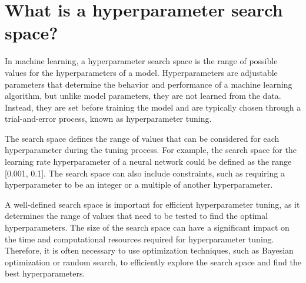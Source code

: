 \section{What is a hyperparameter search space?}
In machine learning, a hyperparameter search space is the range of possible values for the hyperparameters of a model. Hyperparameters are adjustable parameters that determine the behavior and performance of a machine learning algorithm, but unlike model parameters, they are not learned from the data. Instead, they are set before training the model and are typically chosen through a trial-and-error process, known as hyperparameter tuning.

The search space defines the range of values that can be considered for each hyperparameter during the tuning process. For example, the search space for the learning rate hyperparameter of a neural network could be defined as the range [0.001, 0.1]. The search space can also include constraints, such as requiring a hyperparameter to be an integer or a multiple of another hyperparameter.

A well-defined search space is important for efficient hyperparameter tuning, as it determines the range of values that need to be tested to find the optimal hyperparameters. The size of the search space can have a significant impact on the time and computational resources required for hyperparameter tuning. Therefore, it is often necessary to use optimization techniques, such as Bayesian optimization or random search, to efficiently explore the search space and find the best hyperparameters.

